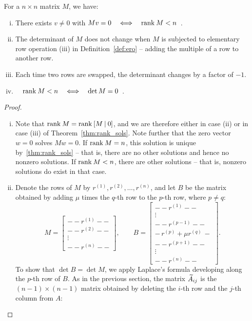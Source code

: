 \begin{lemma}
\label{lem:rank_det}
For a $n \times n$ matrix $M$, we have:
\begin{enumerate}[(i)]
	\item There exists $v\not=0$ with $Mv=0 \quad \Longleftrightarrow \quad \text{rank}\: M<n$~.
	\item The determinant of $M$ does not change when $M$ is subjected to elementary row operation (iii) in Definition~\ref{def:ero} -- adding the multiple of a row to another row.
	\item Each time two rows are swapped, the determinant changes by a factor of $-1$.
	\item $\quad \text{rank}\: M <n \quad \Longleftrightarrow \quad \det M =0$~.
\end{enumerate}
\end{lemma}
\begin{proof}
\begin{enumerate}[(i)]
	\item Note that $\text{rank}\: M = \text{rank}\: [M\:|\:0]$, and we are therefore either in case (ii) or in case (iii) of Theorem~\ref{thm:rank_sols}. Note further that the zero vector $w=0$ solves $Mw=0$. If $\text{rank}\: M = n$, this solution is unique by~\ref{thm:rank_sols} -- that is, there are no other solutions and hence no nonzero solutions. If $\text{rank}\: M < n$, there are other solutions -- that is, nonzero solutions do exist in that case.
	\item Denote the rows of $M$ by $r^{(1)},r^{(2)},\dots,r^{(n)}$, and let $B$ be the matrix obtained by adding $\mu$ times the $q$-th row to the $p$-th row, where $p \not= q$:
	\[ M = \begin{bmatrix}
	--r^{(1)}-- \\
	--r^{(2)}-- \\
	\vdots \\
	--r^{(n)}--
	\end{bmatrix}, \qquad B = \begin{bmatrix}
	--r^{(1)}-- \\
	\vdots \\
	--r^{(p-1)}-- \\
	-\,r^{(p)} + \mu r^{(q)}\,- \\
	--r^{(p+1)}-- \\
	\vdots \\
	--r^{(n)}--
	\end{bmatrix}. \]
	To show that $\det B = \det M$, we apply Laplace's formula developing along the $p$-th row of $B$. As in the previous section, the matrix $\widetilde{A}_{ij}$ is the $(n-1) \times (n-1)$ matrix obtained by deleting the $i$-th row and the $j$-th column from $A$:

\end{enumerate}
\end{proof}
